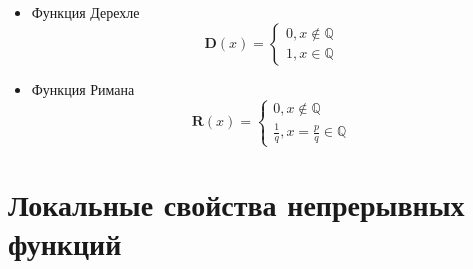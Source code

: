 \documentclass[11pt, a4paper]{article}
\def\Q{\mathbb{Q}}
\begin{document}
\begin{enumerate}
\begin{itemize}
            \item Функция Дерехле
            $$\mathbf{D}(x) = \begin{cases}
                0, x \not\in \Q \\
                1, x \in \Q
            \end{cases}$$
            \item Функция Римана
            $$\mathbf{R}(x) = \begin{cases}
                0, x \not\in \Q \\
                \frac{1}{q}, x = \frac{p}{q} \in \Q
            \end{cases}$$
        \end{itemize}
    \end{enumerate}

    \section{Локальные свойства непрерывных функций}
    
\end{document}
